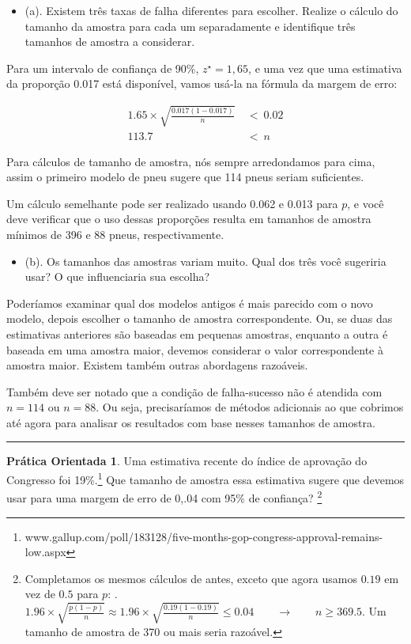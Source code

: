\documentclass[
]{book}
\providecommand{\tightlist}{%
  \setlength{\itemsep}{0pt}\setlength{\parskip}{0pt}}
\theoremstyle{definition}
\theoremstyle{definition}
\theoremstyle{definition}
\newtheorem{exercise}{Prática Orientada}[chapter]
\theoremstyle{definition}
\theoremstyle{remark}
\begin{document}
\begin{itemize}
\tightlist
\item
  (a). Existem três taxas de falha diferentes para escolher. Realize o cálculo do tamanho da amostra para cada um separadamente e identifique três tamanhos de amostra a considerar.
\end{itemize}

Para um intervalo de confiança de 90\%, \(z^{\star} = 1,65\), e uma vez que uma estimativa da proporção 0.017 está disponível, vamos usá-la na fórmula da margem de erro:

\begin{align*}
1.65\times \sqrt{\frac{0.017(1-0.017)}{n}} &\ < \ 0.02 \\
113.7 &\ < \ n
\end{align*}

Para cálculos de tamanho de amostra, nós sempre arredondamos para cima, assim o primeiro modelo de pneu sugere que 114 pneus seriam suficientes.

Um cálculo semelhante pode ser realizado usando 0.062 e 0.013 para \(p\), e você deve verificar que o uso dessas proporções resulta em tamanhos de amostra mínimos de 396 e 88 pneus, respectivamente.

\begin{itemize}
\tightlist
\item
  (b). Os tamanhos das amostras variam muito. Qual dos três você sugeriria usar? O que influenciaria sua escolha?
\end{itemize}

Poderíamos examinar qual dos modelos antigos é mais parecido com o novo modelo, depois escolher o tamanho de amostra correspondente. Ou, se duas das estimativas anteriores são baseadas em pequenas amostras, enquanto a outra é baseada em uma amostra maior, devemos considerar o valor correspondente à amostra maior. Existem também outras abordagens razoáveis.

Também deve ser notado que a condição de falha-sucesso não é atendida com \(n = 114\) ou \(n = 88\). Ou seja, precisaríamos de métodos adicionais ao que cobrimos até agora para analisar os resultados com base nesses tamanhos de amostra.

\begin{center}\rule{0.5\linewidth}{0.5pt}\end{center}

\begin{exercise}
\protect\hypertarget{exr:unnamed-chunk-230}{}{\label{exr:unnamed-chunk-230} }Uma estimativa recente do índice de aprovação do Congresso foi 19\%.\footnote{www.gallup.com/poll/183128/five-months-gop-congress-approval-remains-low.aspx} Que tamanho de amostra essa estimativa sugere que devemos usar para uma margem de erro de 0,.04 com 95\% de confiança? \footnote{Completamos os mesmos cálculos de antes, exceto que agora usamos \(0.19\) em vez de \(0.5\) para \(p\): . \(1.96 \times \sqrt{\frac{p(1-p)}{n}} \approx 1.96 \times \sqrt{\frac{0.19(1-0.19)}{n}} \leq 0.04 \qquad\to\qquad n \geq 369.5\). Um tamanho de amostra de 370 ou mais seria razoável.}
\end{exercise}
\end{document}
